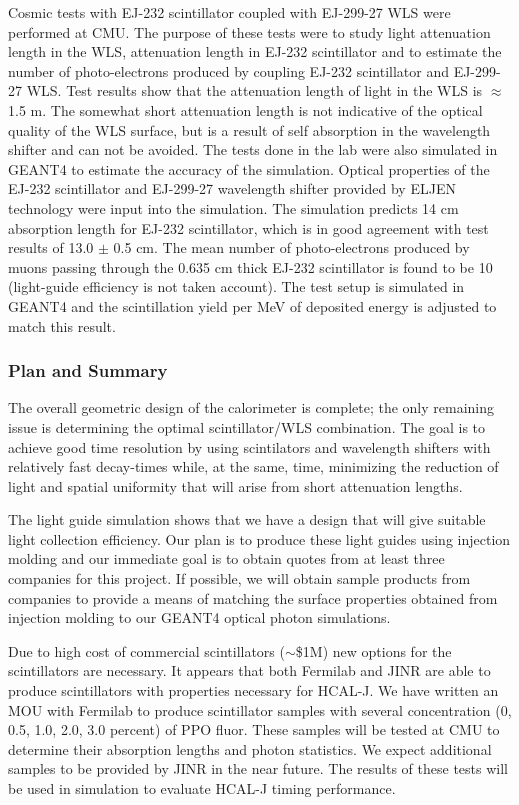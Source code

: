 \documentclass[11pt]{article}
\begin{document}
{Cosmic tests with EJ-232 scintillator coupled with EJ-299-27 WLS were performed at CMU.
The purpose of these tests were to study light attenuation length in the WLS, attenuation length  
in EJ-232 scintillator and to estimate the number of photo-electrons produced by coupling EJ-232 scintillator and EJ-299-27 WLS. 
Test results show that the attenuation length of light in the WLS is $\approx$ 1.5 m. 
The somewhat short attenuation length is not indicative of the optical quality of the WLS surface, but is a result of 
self absorption in the wavelength shifter and can not be avoided. 
The tests done in the lab were also simulated in GEANT4 to estimate the accuracy of the simulation. 
Optical properties of the EJ-232 scintillator and EJ-299-27 wavelength shifter provided 
by ELJEN technology were input into the simulation. The simulation predicts 14 cm absorption length for EJ-232 scintillator, which 
is in good agreement with test results of 13.0 $\pm$ 0.5 cm. 
The mean number of photo-electrons produced by muons passing through the 0.635 cm thick EJ-232 scintillator 
is found to be 10 (light-guide efficiency is not taken account). 
The test setup is simulated in GEANT4 and the scintillation yield per MeV of deposited energy is adjusted to 
match this result. 

\subsubsection{Plan and Summary}
\label{sec:Summary}

The overall geometric design of the calorimeter is complete; the only remaining  issue is determining the optimal scintillator/WLS combination.  The goal is to achieve good time resolution by using scintilators and wavelength shifters with
relatively fast decay-times while, at the same, time, minimizing the reduction of light and spatial uniformity that will arise from
short attenuation lengths.

The light guide simulation shows that we have a design that will give suitable light collection efficiency. 
Our plan is to produce these light guides using injection molding and our immediate goal is to obtain quotes from at least three companies for this project.  If possible, we will obtain sample products from companies to provide a means of matching the surface properties obtained from injection molding to our GEANT4 optical photon simulations.

Due to high cost of commercial scintillators ($\sim$\$1M) new options for the scintillators are 
necessary. It appears that both Fermilab and JINR are able to produce scintillators with properties necessary for HCAL-J. 
We have written an MOU with Fermilab to produce scintillator samples with several concentration (0, 0.5, 1.0, 2.0, 3.0 percent)  of PPO fluor.  These samples will be tested at CMU to determine their absorption lengths 
and photon statistics.  We expect additional samples to be provided by JINR in the near future.   The results of these tests will be used in simulation to evaluate HCAL-J timing  performance.

}
\end{document}
